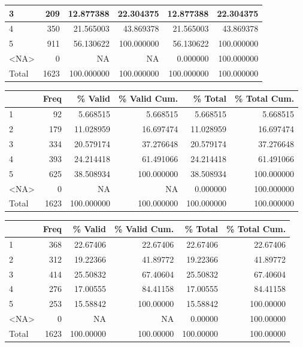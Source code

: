 \documentclass[
  letterpaper,
  DIV=11,
  numbers=noendperiod]{scrartcl}
\begin{document}
\begin{table}
\begin{tabular}[t]{l|r|r|r|r|r}
\hline
3 & 209 & 12.877388 & 22.304375 & 12.877388 & 22.304375\\
\hline
4 & 350 & 21.565003 & 43.869378 & 21.565003 & 43.869378\\
\hline
5 & 911 & 56.130622 & 100.000000 & 56.130622 & 100.000000\\
\hline
<NA> & 0 & NA & NA & 0.000000 & 100.000000\\
\hline
Total & 1623 & 100.000000 & 100.000000 & 100.000000 & 100.000000\\
\hline
\end{tabular}
\centering
\begin{tabular}[t]{l|r|r|r|r|r}
\hline
  & Freq & \% Valid & \% Valid Cum. & \% Total & \% Total Cum.\\
\hline
1 & 92 & 5.668515 & 5.668515 & 5.668515 & 5.668515\\
\hline
2 & 179 & 11.028959 & 16.697474 & 11.028959 & 16.697474\\
\hline
3 & 334 & 20.579174 & 37.276648 & 20.579174 & 37.276648\\
\hline
4 & 393 & 24.214418 & 61.491066 & 24.214418 & 61.491066\\
\hline
5 & 625 & 38.508934 & 100.000000 & 38.508934 & 100.000000\\
\hline
<NA> & 0 & NA & NA & 0.000000 & 100.000000\\
\hline
Total & 1623 & 100.000000 & 100.000000 & 100.000000 & 100.000000\\
\hline
\end{tabular}
\centering
\begin{tabular}[t]{l|r|r|r|r|r}
\hline
  & Freq & \% Valid & \% Valid Cum. & \% Total & \% Total Cum.\\
\hline
1 & 368 & 22.67406 & 22.67406 & 22.67406 & 22.67406\\
\hline
2 & 312 & 19.22366 & 41.89772 & 19.22366 & 41.89772\\
\hline
3 & 414 & 25.50832 & 67.40604 & 25.50832 & 67.40604\\
\hline
4 & 276 & 17.00555 & 84.41158 & 17.00555 & 84.41158\\
\hline
5 & 253 & 15.58842 & 100.00000 & 15.58842 & 100.00000\\
\hline
<NA> & 0 & NA & NA & 0.00000 & 100.00000\\
\hline
Total & 1623 & 100.00000 & 100.00000 & 100.00000 & 100.00000\\
\hline
\end{tabular}
\centering
\begin{tabular}[t]{l|r|r|r|r|r}

\end{tabular}
\end{table}
\end{document}
